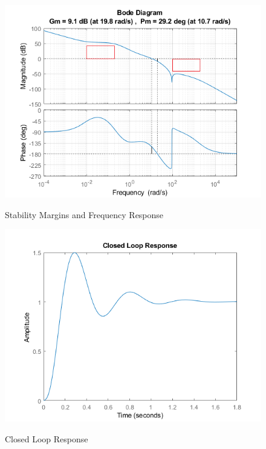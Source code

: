\documentclass[]{article}
\begin{document}
\begin{figure}[h]
	\caption{Stability Margins and Frequency Response}
	\centering
	\includegraphics[width=\textwidth]{margin}
	\label{fig:margin}
\end{figure}

\begin{figure}[h]
	\caption{Closed Loop Response}
	\centering
	\includegraphics[width=\textwidth]{ClosedLoop}
	\label{fig:cl}
\end{figure}
\end{document}
